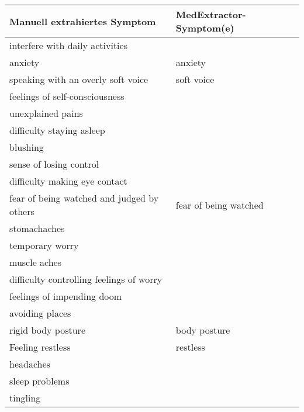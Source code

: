 \begin{table}[H]
\begin{center}
\begin{tabular}{ll}
\toprule
                      Manuell extrahiertes Symptom &       MedExtractor-Symptom(e) \\
\midrule
               interfere with daily activities &                       \\
                                       anxiety &               anxiety \\
            speaking with an overly soft voice &            soft voice \\
                feelings of self-consciousness &                       \\
                             unexplained pains &                       \\
                     difficulty staying asleep &                       \\
                                      blushing &                       \\
                       sense of losing control &                       \\
                 difficulty making eye contact &                       \\
    fear of being watched and judged by others & fear of being watched \\
                                  stomachaches &                       \\
                               temporary worry &                       \\
                                  muscle aches &                       \\
      difficulty controlling feelings of worry &                       \\
                    feelings of impending doom &                       \\
                               avoiding places &                       \\
                            rigid body posture &          body posture \\
                              Feeling restless &              restless \\
                                     headaches &                       \\
                                sleep problems &                       \\
                                      tingling &                       \\

\end{tabular}
\end{center}
\end{table}
